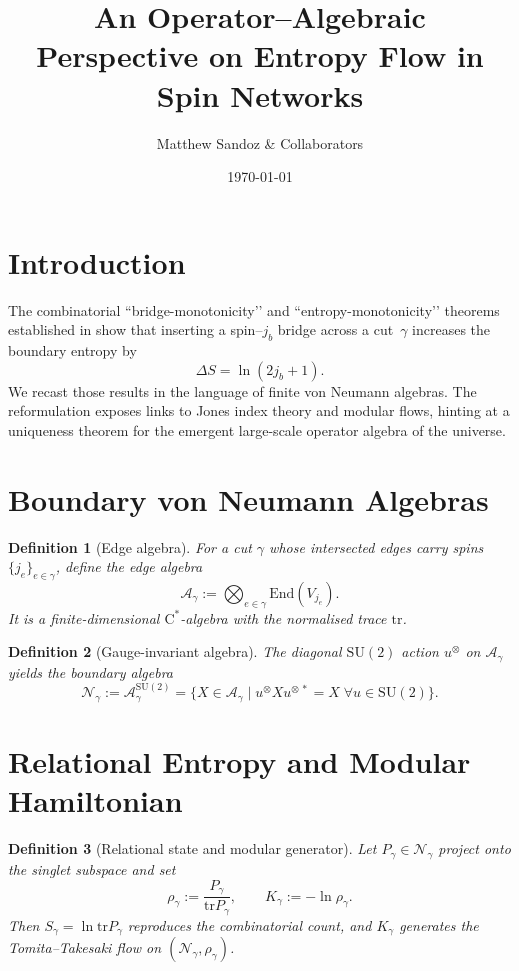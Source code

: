\documentclass[11pt]{article}
\newtheorem{definition}{Definition}[section]
\begin{document}
\title{An Operator–Algebraic Perspective on Entropy Flow in Spin Networks}
\author{\small Matthew Sandoz \& Collaborators}
\date{\today}
\maketitle

\section{Introduction}
The combinatorial “bridge-monotonicity’’ and “entropy-monotonicity’’ theorems
established in \cite{BridgeMono,EntropyMono}
show that inserting a spin–$j_b$ bridge across a cut~$\gamma$ increases the
boundary entropy by
\[
  \Delta S = \ln(2j_b+1).
\]
We recast those results in the language of finite von Neumann algebras.  
The reformulation exposes links to Jones index theory and modular flows, hinting
at a uniqueness theorem for the emergent large-scale operator algebra of the
universe.

\section{Boundary von Neumann Algebras}

\begin{definition}[Edge algebra]
For a cut $\gamma$ whose intersected edges carry spins
$\{j_e\}_{e\in\gamma}$, define the \emph{edge algebra}
\[
  \mathcal A_{\gamma} := \bigotimes_{e\in\gamma} \mathrm{End}(V_{j_e}).
\]
It is a finite-dimensional $\mathrm C^\ast$-algebra with the normalised trace
$\mathrm{tr}$.
\end{definition}

\begin{definition}[Gauge-invariant algebra]
The diagonal $\mathrm{SU}(2)$ action $u^{\otimes}$ on
$\mathcal A_\gamma$ yields the \emph{boundary algebra}
\[
  \mathcal N_{\gamma} := 
  \mathcal A_{\gamma}^{\mathrm{SU}(2)}
  =
  \{X\in\mathcal A_{\gamma}\mid
    u^{\otimes} X u^{\otimes\,*}=X\;\forall u\in \mathrm{SU}(2)\}.
\]
\end{definition}

\section{Relational Entropy and Modular Hamiltonian}

\begin{definition}[Relational state and modular generator]
Let $P_{\gamma}\in\mathcal N_{\gamma}$ project onto the singlet subspace and set
\[
  \rho_{\gamma}:=\frac{P_{\gamma}}{\mathrm{tr}P_{\gamma}},\qquad
  K_{\gamma}:=-\ln\rho_{\gamma}.
\]
Then $S_{\gamma}=\ln\mathrm{tr}P_{\gamma}$ reproduces the combinatorial count,
and $K_{\gamma}$ generates the Tomita–Takesaki flow on
$(\mathcal N_{\gamma},\rho_{\gamma})$.
\end{definition}
\end{document}
